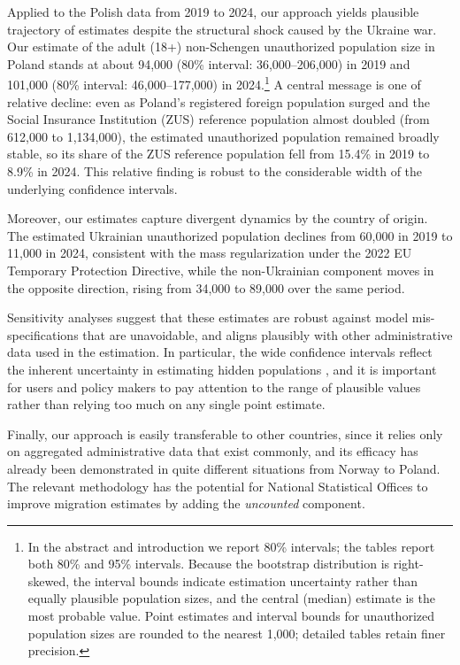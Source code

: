 Applied to the Polish data from 2019 to 2024, our approach yields plausible trajectory of estimates despite the structural shock caused by the Ukraine war. Our estimate of the adult (18+) non-Schengen unauthorized population size in Poland stands at about 94,000 (80\% interval: 36,000--206,000) in 2019 and 101,000 (80\% interval: 46,000--177,000) in 2024.\footnote{In the abstract and introduction we report 80\% intervals; the tables report both 80\% and 95\% intervals. Because the bootstrap distribution is right-skewed, the interval bounds indicate estimation uncertainty rather than equally plausible population sizes, and the central (median) estimate is the most probable value. Point estimates and interval bounds for unauthorized population sizes are rounded to the nearest 1,000; detailed tables retain finer precision.} A central message is one of relative decline: even as Poland's registered foreign population surged and the Social Insurance Institution (ZUS) reference population almost doubled (from 612,000 to 1,134,000), the estimated unauthorized population remained broadly stable, so its share of the ZUS reference population fell from 15.4\% in 2019 to 8.9\% in 2024. This relative finding is robust to the considerable width of the underlying confidence intervals.

Moreover, our estimates capture divergent dynamics by the country of origin. The estimated Ukrainian unauthorized population declines from 60,000 in 2019 to 11,000 in 2024, consistent with the mass regularization under the 2022 EU Temporary Protection Directive, while the non-Ukrainian component moves in the opposite direction, rising from 34,000 to 89,000 over the same period. 

Sensitivity analyses suggest that these estimates are robust against model mis-specifications that are unavoidable, and aligns plausibly with other administrative data used in the estimation. In particular, the wide confidence intervals reflect the inherent uncertainty in estimating hidden populations \citep[cf.~][]{van2021uncertainty}, and it is important for users and policy makers to pay attention to the range of plausible values rather than relying too much on any single point estimate.

Finally, our approach is easily transferable to other countries, since it relies only on aggregated administrative data that exist commonly, and its efficacy has already been demonstrated in quite different situations from Norway to Poland. The relevant methodology has the potential for National Statistical Offices to improve migration estimates by adding the \emph{uncounted} component.

